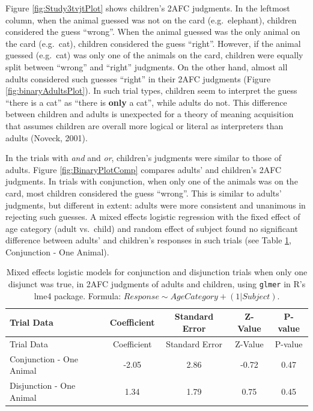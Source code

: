 \documentclass[man]{apa6}
\theoremstyle{definition}
\theoremstyle{definition}
\theoremstyle{definition}
\theoremstyle{remark}
\begin{document}
Figure \ref{fig:Study3tvjtPlot} shows children's 2AFC judgments. In the
leftmost column, when the animal guessed was not on the card
(e.g.~elephant), children considered the guess \enquote{wrong}. When the
animal guessed was the only animal on the card (e.g.~cat), children
considered the guess \enquote{right}. However, if the animal guessed
(e.g.~cat) was only one of the animals on the card, children were
equally split between \enquote{wrong} and \enquote{right} judgments. On
the other hand, almost all adults considered such guesses
\enquote{right} in their 2AFC judgments (Figure
\ref{fig:binaryAdultsPlot}). In such trial types, children seem to
interpret the guess \enquote{there is a cat} as \enquote{there is
\textbf{only} a cat}, while adults do not. This difference between
children and adults is unexpected for a theory of meaning acquisition
that assumes children are overall more logical or literal as
interpreters than adults (Noveck, 2001).

In the trials with \emph{and} and \emph{or}, children's judgments were
similar to those of adults. Figure \ref{fig:BinaryPlotComp} compares
adults' and children's 2AFC judgments. In trials with conjunction, when
only one of the animals was on the card, most children considered the
guess \enquote{wrong}. This is similar to adults' judgments, but
different in extent: adults were more consistent and unanimous in
rejecting such guesses. A mixed effects logistic regression with the
fixed effect of age category (adult vs.~child) and random effect of
subject found no significant difference between adults' and children's
responses in such trials (see Table \ref{tab:statsStudy3}, Conjunction -
One Animal).

\begin{longtable}[]{@{}lcccc@{}}
\caption{\label{tab:statsStudy3} Mixed effects logistic models for
conjunction and disjunction trials when only one disjunct was true, in
2AFC judgments of adults and children, using \texttt{glmer} in R's lme4
package. Formula:
\(Response \sim Age Category + (1|Subject)\).}\tabularnewline
\toprule
Trial Data & Coefficient & Standard Error & Z-Value &
P-value\tabularnewline
\midrule
\endfirsthead
\toprule
Trial Data & Coefficient & Standard Error & Z-Value &
P-value\tabularnewline
\midrule
\endhead
Conjunction - One Animal & -2.05 & 2.86 & -0.72 & 0.47\tabularnewline
Disjunction - One Animal & 1.34 & 1.79 & 0.75 & 0.45\tabularnewline
\bottomrule
\end{longtable}
\end{document}
